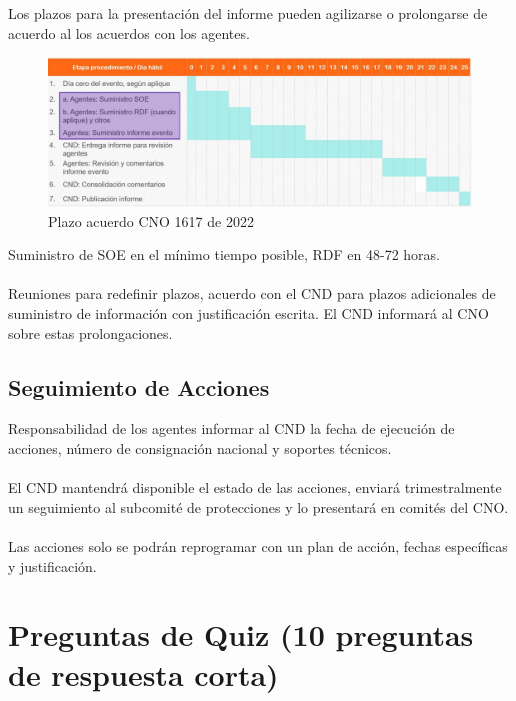 \documentclass[a5paper]{book}%
\begin{document}
Los plazos para la presentación del informe pueden agilizarse o prolongarse de acuerdo al los acuerdos con los agentes.

\begin{figure}[H]
  \caption{Plazo acuerdo CNO 1617 de 2022}
  \label{fig:plazo1617}
  \includegraphics[width=\linewidth]{plazo16172022}
 \end{figure}

Suministro de SOE en el mínimo tiempo posible, RDF en 48-72 horas.\\\\
Reuniones para redefinir plazos, acuerdo con el CND para plazos adicionales de suministro de información con justificación escrita. El CND informará al CNO sobre estas prolongaciones.

\subsection{Seguimiento de Acciones}

    Responsabilidad de los agentes informar al CND la fecha de ejecución de acciones, número de consignación nacional y soportes técnicos.\\\\
    El CND mantendrá disponible el estado de las acciones, enviará trimestralmente un seguimiento al subcomité de protecciones y lo presentará en comités del CNO.\\\\
    Las acciones solo se podrán reprogramar con un plan de acción, fechas específicas y justificación.

\section{Preguntas de Quiz (10 preguntas de respuesta corta)}
\end{document}
